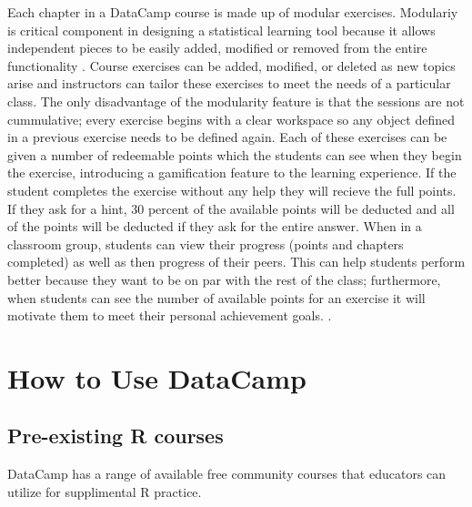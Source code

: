 \documentclass{tise_style}
\begin{document}
Each chapter in a DataCamp course is made up of modular exercises. Modulariy is critical component in designing a statistical
learning tool because it allows independent pieces to be easily added, modified or removed from the entire functionality
\citep{Hare2017}. Course exercises can be added, modified, or deleted as new topics arise and instructors can tailor
these exercises to meet the needs of a particular class. The only disadvantage of the modularity feature is that the sessions
are not cummulative; every exercise begins with a clear workspace so any object defined in a previous exercise needs to be
defined again. Each of these exercises can be given a number of redeemable points which the students can see when they begin
the exercise, introducing a gamification feature to the learning experience. If the student completes the exercise without
any help they will recieve the full points. If they ask for a hint, 30 percent of the available points will be deducted and
all of the points will be deducted if they ask for the entire answer. When in a classroom group, students can view their
progress (points and chapters completed) as well as then progress of their peers. This can help students perform better
because they want to be on par with the rest of the class; furthermore, when students can see the number of available points
for an exercise it will motivate them to meet their personal achievement goals. \citep{Chang2016}.




\section{How to Use DataCamp}

\subsection{Pre-existing R courses}
DataCamp has a range of available free community courses that educators can utilize for supplimental R practice.
\end{document}
